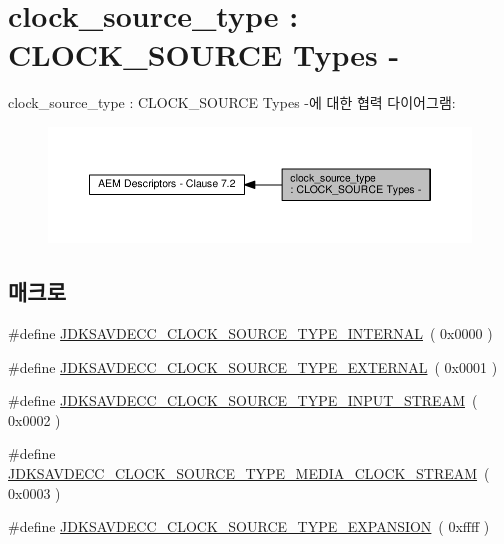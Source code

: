 \hypertarget{group__clock__source__type}{}\section{clock\+\_\+source\+\_\+type \+: C\+L\+O\+C\+K\+\_\+\+S\+O\+U\+R\+CE Types -\/}
\label{group__clock__source__type}
clock\+\_\+source\+\_\+type \+: C\+L\+O\+C\+K\+\_\+\+S\+O\+U\+R\+CE Types -\/에 대한 협력 다이어그램\+:
\nopagebreak
\begin{figure}[H]
\begin{center}
\leavevmode
\includegraphics[width=350pt]{group__clock__source__type}
\end{center}
\end{figure}
\subsection*{매크로}
\begin{DoxyCompactItemize}
\item 
\#define \hyperlink{group__clock__source__type_gad2d5e812c881d48dd7b731417a1ed57f}{J\+D\+K\+S\+A\+V\+D\+E\+C\+C\+\_\+\+C\+L\+O\+C\+K\+\_\+\+S\+O\+U\+R\+C\+E\+\_\+\+T\+Y\+P\+E\+\_\+\+I\+N\+T\+E\+R\+N\+AL}~( 0x0000 )
\item 
\#define \hyperlink{group__clock__source__type_ga5f683edcc5aa6afc0ae9d6a146323ecc}{J\+D\+K\+S\+A\+V\+D\+E\+C\+C\+\_\+\+C\+L\+O\+C\+K\+\_\+\+S\+O\+U\+R\+C\+E\+\_\+\+T\+Y\+P\+E\+\_\+\+E\+X\+T\+E\+R\+N\+AL}~( 0x0001 )
\item 
\#define \hyperlink{group__clock__source__type_gad9a3d219c2dcf04eb1ef29deb30fdc7b}{J\+D\+K\+S\+A\+V\+D\+E\+C\+C\+\_\+\+C\+L\+O\+C\+K\+\_\+\+S\+O\+U\+R\+C\+E\+\_\+\+T\+Y\+P\+E\+\_\+\+I\+N\+P\+U\+T\+\_\+\+S\+T\+R\+E\+AM}~( 0x0002 )
\item 
\#define \hyperlink{group__clock__source__type_ga68e7086ebb51a44ed70f8066a9c5ba6c}{J\+D\+K\+S\+A\+V\+D\+E\+C\+C\+\_\+\+C\+L\+O\+C\+K\+\_\+\+S\+O\+U\+R\+C\+E\+\_\+\+T\+Y\+P\+E\+\_\+\+M\+E\+D\+I\+A\+\_\+\+C\+L\+O\+C\+K\+\_\+\+S\+T\+R\+E\+AM}~( 0x0003 )
\item 
\#define \hyperlink{group__clock__source__type_ga34d4948695ba2095e3b6a4902ca35e8f}{J\+D\+K\+S\+A\+V\+D\+E\+C\+C\+\_\+\+C\+L\+O\+C\+K\+\_\+\+S\+O\+U\+R\+C\+E\+\_\+\+T\+Y\+P\+E\+\_\+\+E\+X\+P\+A\+N\+S\+I\+ON}~( 0xffff )
\end{DoxyCompactItemize}


